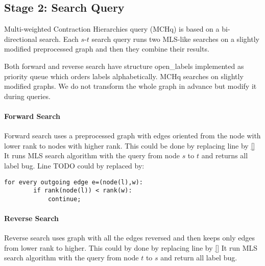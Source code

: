 
\subsection{Stage 2: Search Query}
\label{subsecStage2}

Multi-weighted Contraction Hierarchies query (MCHq) is based on a bi-directional search.
Each $s$-$t$ search query runs two MLS-like searches on a slightly modified preprocessed graph
and then they combine their results.

Both forward and reverse search have structure open\_labels implemented as priority queue which orders labels alphabetically. MCHq searches on slightly modified graphs. 
We do not transform the whole graph in advance but modify it during queries.

\paragraph*{Forward Search}
Forward search uses a preprocessed graph with edges oriented from the node with lower rank to nodes with higher rank. This could be done by replacing line  by \ref{}
It runs MLS search algorithm with the query from node $s$ to $t$ and returns all label bug.
Line TODO could by replaced by:

\begin{lstlisting}[caption={Forward Search},label=list:8-6,captionpos=t,float,abovecaptionskip=-\medskipamount]
    for every outgoing edge e=(node(l),w):
    	if rank(node(l)) < rank(w):
        	continue;
\end{lstlisting}

\paragraph*{Reverse Search}
Reverse search uses graph with all the edges reversed and then keeps only edges
from lower rank to higher. 
This could by done by replacing line  by \ref{}
It run MLS search algorithm with the query from node $t$ to $s$ and return all label bug.

